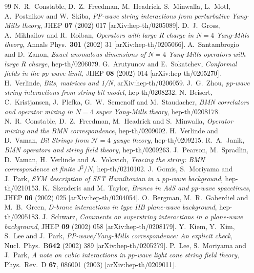 \documentclass[12pt]{article}
\def\mc{\mathcal}
\numberwithin{equation}{section} \setlength{\textwidth}{17cm}
\begin{document}
\begin{thebibliography}{99}
N.~R.~Constable, D.~Z.~Freedman, M.~Headrick, S.~Minwalla, L.~Motl,
A.~Postnikov and W.~Skiba,
{\em PP-wave string interactions from perturbative Yang-Mills theory},
JHEP {\bf 07} (2002) 017 [arXiv:hep-th/0205089].
D.~J.~Gross, A.~Mikhailov and R.~Roiban,
{\em Operators with large R charge in $N=4$ Yang-Mills theory},
Annals Phys.~{\bf 301} (2002) 31 [arXiv:hep-th/0205066].
A.~Santambrogio and D.~Zanon,
{\em Exact anomalous dimensions of $N=4$ Yang-Mills operators with large R
charge},
hep-th/0206079.
G.~Arutyunov and E.~Sokatchev, {\em Conformal fields in the pp-wave
limit},
JHEP {\bf 08} (2002) 014 [arXiv:hep-th/0205270].
H.~Verlinde, {\em Bits, matrices and 1/N},
arXiv:hep-th/0206059.
J.~G.~Zhou,
{\em pp-wave string interactions from string bit model},
hep-th/0208232.
N.~Beisert, C.~Kristjansen, J.~Plefka, G.~W.~Semenoff and M.~Staudacher,
{\em BMN correlators and operator mixing in $N=4$ super Yang-Mills
theory},
hep-th/0208178.
 N.~R.~Constable, D.~Z.~Freedman, M.~Headrick and
S.~Minwalla,
{\em Operator mixing and the BMN correspondence},
hep-th/0209002.
H.~Verlinde and D.~Vaman,
{\em Bit Strings from ${\mc N}=4$ gauge theory},
hep-th/0209215.
R.~A.~Janik, {\em BMN operators and string field theory}, hep-th/0209263.
J.~Pearson, M.~Spradlin, D.~Vaman, H.~Verlinde and A.~Volovich,
{\em Tracing the string: BMN correspondence at finite $J^2/N$},
hep-th/0210102.
J.~Gomis, S.~Moriyama and J.~Park,
{\em SYM description of SFT Hamiltonian in a pp-wave background},
hep-th/0210153.
K.~Skenderis and M.~Taylor, {\em Branes in AdS and pp-wave spacetimes},
JHEP {\bf 06} (2002) 025
[arXiv:hep-th/0204054].
O.~Bergman, M.~R.~Gaberdiel and M.~B.~Green,
{\em D-brane interactions in type IIB plane-wave background},
hep-th/0205183.
J.~Schwarz, {\em Comments on superstring interactions in a plane-wave
background},
JHEP {\bf 09} (2002) 058 [arXiv:hep-th/0208179].
Y.~Kiem, Y.~Kim, S.~Lee and J.~Park,
{\em PP-wave/Yang-Mills correspondence: An explicit check},
Nucl.~Phys.~B{\bf 642} (2002) 389 [arXiv:hep-th/0205279].
P.~Lee, S.~Moriyama and J.~Park,
{\em A note on cubic interactions in pp-wave light cone string field  
theory},
Phys.\ Rev.\ D {\bf 67}, 086001 (2003)
[arXiv:hep-th/0209011].
\end{thebibliography}
\end{document}
